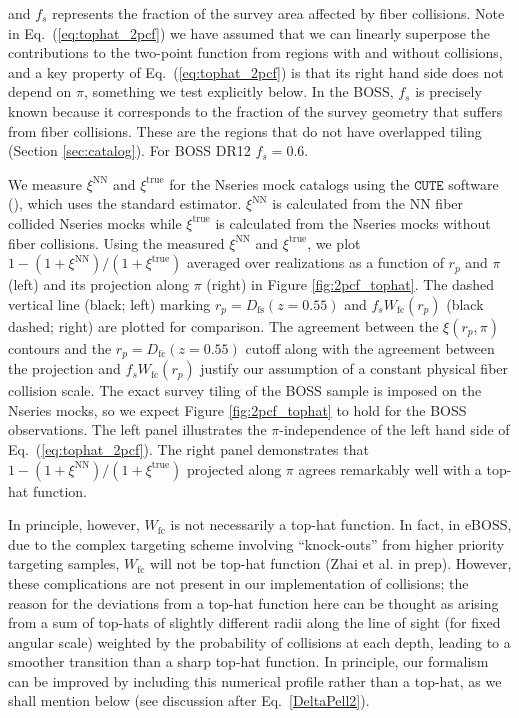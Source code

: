 \noindent and $f_s$ represents the fraction of the survey area affected by fiber 
collisions. Note in Eq.~(\ref{eq:tophat_2pcf}) we have assumed that we can linearly superpose the contributions to the two-point function from regions with and without collisions, and a key property of Eq.~(\ref{eq:tophat_2pcf}) is that its right hand side does not depend on $\pi$, something we test explicitly below. 
In the BOSS, $f_s$ is precisely known because 
it corresponds to the fraction of the survey geometry that suffers from 
fiber collisions. These are the regions that do not have overlapped tiling 
(Section \ref{sec:catalog}). For BOSS DR12 $f_s = 0.6$. 

We measure $\xi^\mathrm{NN}$ and $\xi^\mathrm{true}$ for the Nseries 
mock catalogs using the $\mathtt{CUTE}$ software (\citealt{Alonso:2012aa}), which 
uses the standard \cite{Landy:1993aa} estimator. $\xi^\mathrm{NN}$ 
is calculated from the NN fiber collided Nseries mocks while 
$\xi^\mathrm{true}$ is calculated from the Nseries mocks without fiber 
collisions. Using the measured $\xi^\mathrm{NN}$ and $\xi^\mathrm{true}$, 
we plot 
$1- (1+\xi^\mathrm{NN})/(1 + \xi^\mathrm{true})$ averaged over realizations as 
a function of $r_p$ and $\pi$ (left) and its projection 
along $\pi$ (right) in Figure \ref{fig:2pcf_tophat}. The dashed vertical 
line (black; left) marking $r_p = D_\mathrm{fs}(z=0.55)$ and $f_s W_\mathrm{fc}(r_p)$ 
(black dashed; right) are plotted for comparison. The agreement 
between the $\xi(r_p, \pi)$ contours and the $r_p = D_\mathrm{fc}(z=0.55)$ 
cutoff along with the agreement between the projection and 
$f_s W_\mathrm{fc}(r_p)$ justify our assumption of a constant physical 
fiber collision scale. The exact survey tiling of the BOSS sample is 
imposed on the Nseries mocks, so we expect Figure \ref{fig:2pcf_tophat} 
to hold for the BOSS observations. The left panel illustrates 
the $\pi$-independence of the left hand side of Eq.~(\ref{eq:tophat_2pcf}). 
The right panel demonstrates that 
$1- (1+{\xi^\mathrm{NN}})/(1 + {\xi^\mathrm{true}})$ projected
along $\pi$ agrees remarkably well with a top-hat function. 

In principle, however,
$W_\mathrm{fc}$ is not necessarily a top-hat function. In fact,
in eBOSS, due to the complex targeting scheme involving ``knock-outs'' from 
higher priority targeting samples, $W_\mathrm{fc}$ will not be top-hat function 
(Zhai et al. in prep). However, these complications are not present in our implementation of collisions; the reason for the deviations from a top-hat function here can be thought as arising from a sum of top-hats of slightly different radii along the line of sight (for fixed angular scale) weighted by the probability of collisions at each depth, leading to a smoother transition than a sharp top-hat function. In principle, our formalism  can be improved by including this numerical profile rather than a top-hat, as we shall mention below (see discussion after Eq.~\ref{DeltaPell2}). 


